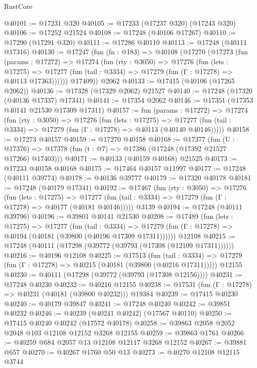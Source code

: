 \begin{lexlean}{RustCore}
\begin{coremodule}
@40101 := @17231 @320
@40105 := @17233 (@17237 @320) (@17243 @320)
@40106 := @17252 @21524
@40108 := @17248 (@40106 @17267)
@40110 := @17290 (@17291 @320)
@40111 := @17286 @40110
@40113 := @17248 (@40111 @17316)
@40130 := @17247
    (fun (fn : @183) =>
    @40108
      (@17270
        (@17273
          (fun (params : @17272) =>
          @17274
            (fun (rty : @3050) =>
            @17276
              (fun (lets : @17275) =>
              @17277 (fun (tail : @3334) => @17279 (fun (Γ : @17278) => @40113 @17363))))))
        @17409))
    @2062
@40133 := @17415 (@40106 (@17265 @2062))
@40136 := @17328 (@17329 @2062) @21527
@40140 := @17248 (@17320 (@40136 @17337) @17341)
@40141 := @17354 @2062
@40146 := @17351 (@17353 @40141 @21530 @17309 @17311)
@40157 := fun (params : @17272) =>
  @17274
    (fun (rty : @3050) =>
    @17276
      (fun (lets : @17275) =>
      @17277 (fun (tail : @3334) => @17279 (fun (Γ : @17278) => @40113 (@40140 @40146)))))
@40158 := @17273 @40157
@40159 := @17270 @40158
@40168 := @17377
    (fun (U : @17376) => @17378 (fun (t : @7) => @17386 (@17248 (@17392 @21527 @17266) @17403)))
@40171 := @40133 (@40159 @40168) @21525
@40173 := @17233 @40158 @40168
@40175 := @17464 @40157 @11997
@40177 := @17248 (@40111 @39774)
@40178 := @40136 @39777
@40179 := @17320 @40178
@40181 := @17248 (@40179 @17341)
@40192 := @17467
    (fun (rty : @3050) =>
    @17276
      (fun (lets : @17275) =>
      @17277 (fun (tail : @3334) => @17279 (fun (Γ : @17278) => @40177 (@40181 @40146)))))
    @3139
@40194 := @17248 (@40111 @39796)
@40196 := @39801 @40141 @21530
@40208 := @17489
    (fun (lets : @17275) =>
    @17277
      (fun (tail : @3334) =>
      @17279 (fun (Γ : @17278) => @40194 (@40181 (@39800 (@40196 @17309 @17311))))))
    @12108
@40215 := @17248 (@40111 (@17298 (@39772 (@39793 (@17308 (@12109 @17311))))))
@40216 := @40196 @12108
@40225 := @17513
    (fun (tail : @3334) => @17279 (fun (Γ : @17278) => @40215 (@40181 (@39800 (@40216 @17311)))))
    @12155
@40230 := @40111 (@17298 (@39772 (@39793 (@17308 @12156))))
@40231 := @17248 @40230
@40232 := @40216 @12155
@40238 := @17531 (fun (Γ : @17278) => @40231 (@40181 (@39800 @40232))) @19384
@40239 := @17415 @40230
@40240 := @40179 @39847
@40241 := @17248 @40240
@40242 := @39851 @40232
@40246 := @40239 (@40241 @40242) (@17567 @40110)
@40250 := @17415 @40240 @40242 (@17572 @40178)
@40258 := @39863 @2058 @2052 @2048 @103 @12108 @12152 @3268 @12155
@40259 := @39863 @1761
@40266 := @40259 @684 @2057 @13 @12108 @12117 @3268 @12152
@40267 := @39881 @657
@40270 := @40267 @1760 @50 @13
@40273 := @40270 @12108 @12115 @3744

\end{coremodule}
\end{lexlean}
